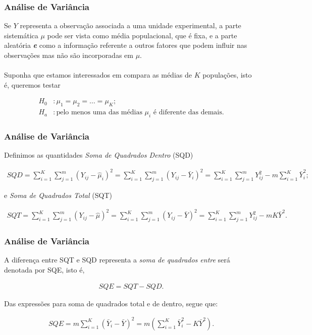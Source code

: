\documentclass{beamer}
\begin{document}
\begin{frame}
\frametitle{Análise de Variância}
Se \(Y\) representa a observação associada a uma unidade experimental, a parte sistemática \(\mu\) pode ser vista como média populacional, que é fixa, e a parte aleatória \textit{\textbf{e}} como a informação referente a outros fatores que podem influir nas observações mas não são incorporadas em \(\mu\). \\~\\


Suponha que estamos interessados em compara as médias de \(K\) populações, isto é, queremos testar

\begin{align*}
H_0 &: \mu_1 = \mu_2 = \ldots = \mu_K;  \\
H_a &: \text{pelo menos uma das médias \(\mu_i\) é diferente das demais.}
\end{align*}
 
\end{frame}

\begin{frame}
\frametitle{Análise de Variância}
Definimos as quantidades \textit{Soma de Quadrados Dentro} (SQD)

\begin{align*}
SQD = \sum_{i=1}^K\sum_{j=1}^m(Y_{ij}-\hat{\mu}_i)^2 = \sum_{i=1}^K\sum_{j=1}^m(Y_{ij}-\bar{Y}_i)^2 = \sum_{i=1}^K\sum_{j=1}^mY_{ij}^2-m\sum_{i=1}^K\bar{Y}_i^2;  
\end{align*}

e \textit{Soma de Quadrados Total} (SQT)

\begin{align*}
SQT = \sum_{i=1}^K\sum_{j=1}^m(Y_{ij}-\hat{\mu})^2 = \sum_{i=1}^K\sum_{j=1}^m(Y_{ij}-\bar{Y})^2 = \sum_{i=1}^K\sum_{j=1}^mY_{ij}^2-mK\bar{Y}^2.  
\end{align*}

\end{frame}


\begin{frame}
\frametitle{Análise de Variância}
A diferença entre SQT e SQD representa a \textit{soma de quadrados entre} será denotada por SQE, isto é,

\begin{align*}
SQE = SQT-SQD.
\end{align*}

Das expressões para soma de quadrados total e de dentro, segue que:

\begin{align*}
SQE = m\sum_{i=1}^K(\bar{Y}_{i}-\bar{Y})^2 = m(\sum_{i=1}^K\bar{Y}^2_{i}-K\bar{Y}^2).  
\end{align*}

\end{frame}
\end{document}
